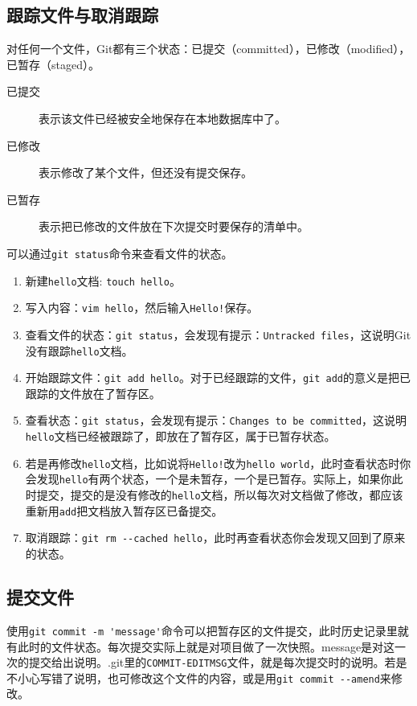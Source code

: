 \documentclass[a4paper,12pt]{article}
\begin{document}
\subsection{跟踪文件与取消跟踪}

对任何一个文件，Git都有三个状态：已提交（committed），已修改（modified），已暂存（staged）。
\begin{description}
\item[已提交] 表示该文件已经被安全地保存在本地数据库中了。
\item[已修改] 表示修改了某个文件，但还没有提交保存。
\item[已暂存] 表示把已修改的文件放在下次提交时要保存的清单中。
\end{description}

可以通过\lstinline|git status|命令来查看文件的状态。

\begin{enumerate}
\item 新建\verb|hello|文档: \lstinline|touch hello|。
\item 写入内容：\lstinline|vim hello|，然后输入\verb|Hello!|保存。
\item 查看文件的状态：\lstinline|git status|，会发现有提示：\verb|Untracked files|，这说明Git没有跟踪\verb|hello|文档。
\item 开始跟踪文件：\lstinline|git add hello|。对于已经跟踪的文件，\lstinline|git add|的意义是把已跟踪的文件放在了暂存区。
\item 查看状态：\lstinline|git status|，会发现有提示：\verb|Changes to be committed|，这说明\verb|hello|文档已经被跟踪了，即放在了暂存区，属于已暂存状态。
\item 若是再修改\verb|hello|文档，比如说将\verb|Hello!|改为\verb|hello world|，此时查看状态时你会发现\verb|hello|有两个状态，一个是未暂存，一个是已暂存。实际上，如果你此时提交，提交的是没有修改的\verb|hello|文档，所以每次对文档做了修改，都应该重新用\lstinline|add|把文档放入暂存区已备提交。
\item 取消跟踪：\lstinline|git rm --cached hello|，此时再查看状态你会发现又回到了原来的状态。
\end{enumerate}

\subsection{提交文件}

使用\lstinline|git commit -m 'message'|命令可以把暂存区的文件提交，此时历史记录里就有此时的文件状态。每次提交实际上就是对项目做了一次快照。message是对这一次的提交给出说明。.git里的\verb|COMMIT-EDITMSG|文件，就是每次提交时的说明。若是不小心写错了说明，也可修改这个文件的内容，或是用\lstinline|git commit --amend|来修改。
\end{document}
